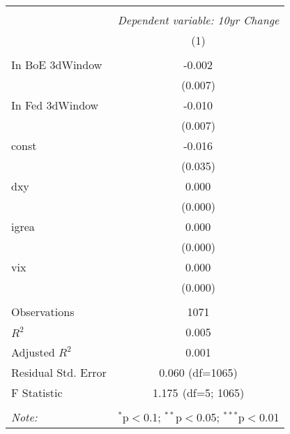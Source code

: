 \begin{table}[!htbp] \centering
\begin{tabular}{@{\extracolsep{5pt}}lc}
\\[-1.8ex]\hline
\hline \\[-1.8ex]
& \multicolumn{1}{c}{\textit{Dependent variable: 10yr Change}} \
\cr \cline{2-2}
\\[-1.8ex] & (1) \\
\hline \\[-1.8ex]
 In BoE 3dWindow & -0.002$^{}$ \\
& (0.007) \\
 In Fed 3dWindow & -0.010$^{}$ \\
& (0.007) \\
 const & -0.016$^{}$ \\
& (0.035) \\
 dxy & 0.000$^{}$ \\
& (0.000) \\
 igrea & 0.000$^{}$ \\
& (0.000) \\
 vix & 0.000$^{}$ \\
& (0.000) \\
\hline \\[-1.8ex]
 Observations & 1071 \\
 $R^2$ & 0.005 \\
 Adjusted $R^2$ & 0.001 \\
 Residual Std. Error & 0.060 (df=1065) \\
 F Statistic & 1.175$^{}$ (df=5; 1065) \\
\hline
\hline \\[-1.8ex]
\textit{Note:} & \multicolumn{1}{r}{$^{*}$p$<$0.1; $^{**}$p$<$0.05; $^{***}$p$<$0.01} \\
\end{tabular}
\end{table}
